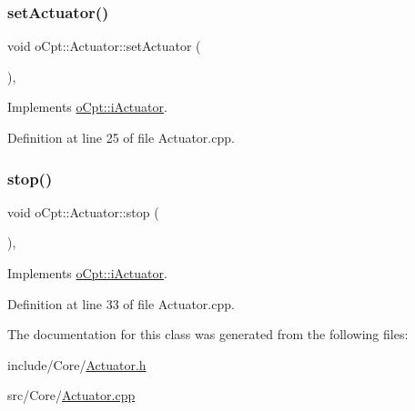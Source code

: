 \subsubsection{\texorpdfstring{set\+Actuator()}{setActuator()}}
{\footnotesize\ttfamily void o\+Cpt\+::\+Actuator\+::set\+Actuator (\begin{DoxyParamCaption}{ }\end{DoxyParamCaption})\hspace{0.3cm}{\ttfamily [override]}, {\ttfamily [virtual]}}



Implements \hyperlink{classo_cpt_1_1i_actuator_a1654bf3167a1dd7c34f770180cd8aaa1}{o\+Cpt\+::i\+Actuator}.



Definition at line 25 of file Actuator.\+cpp.

\hypertarget{classo_cpt_1_1_actuator_aa41132ff134e8b067353459dedbb0f37}{}\label{classo_cpt_1_1_actuator_aa41132ff134e8b067353459dedbb0f37} 
\subsubsection{\texorpdfstring{stop()}{stop()}}
{\footnotesize\ttfamily void o\+Cpt\+::\+Actuator\+::stop (\begin{DoxyParamCaption}{ }\end{DoxyParamCaption})\hspace{0.3cm}{\ttfamily [override]}, {\ttfamily [virtual]}}



Implements \hyperlink{classo_cpt_1_1i_actuator_ae3f9fbb61d920bee1bd297fb5a89625e}{o\+Cpt\+::i\+Actuator}.



Definition at line 33 of file Actuator.\+cpp.



The documentation for this class was generated from the following files\+:\begin{DoxyCompactItemize}
\item 
include/\+Core/\hyperlink{_actuator_8h}{Actuator.\+h}\item 
src/\+Core/\hyperlink{_actuator_8cpp}{Actuator.\+cpp}\end{DoxyCompactItemize}
